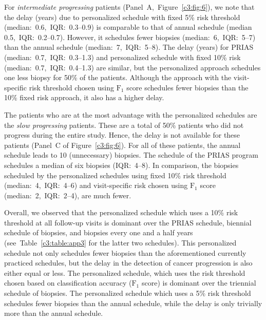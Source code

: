 For \emph{intermediate progressing} patients (Panel~A,~Figure~\ref{c3:fig:6}), we note that the delay (years) due to personalized schedule with fixed 5\% risk threshold (median:~0.6,~IQR:~0.3--0.9) is comparable to that of annual schedule (median 0.5,~IQR:~0.2--0.7). However, it schedules fewer biopsies (median:~6,~IQR:~5--7) than the annual schedule (median:~7,~IQR:~5--8). The delay (years) for PRIAS (median:~0.7,~IQR:~0.3--1.3) and personalized schedule with fixed 10\% risk (median:~0.7,~IQR:~0.4--1.3) are similar, but the personalized approach schedules one less biopsy for 50\% of the patients. Although the approach with the visit-specific risk threshold chosen using $\mbox{F}_1$ score schedules fewer biopsies than the 10\% fixed risk approach, it also has a higher delay.

The patients who are at the most advantage with the personalized schedules are the \emph{slow progressing} patients. These are a total of 50\% patients who did not progress during the entire study. Hence, the delay is not available for these patients (Panel~C of Figure~\ref{c3:fig:6}). For all of these patients, the annual schedule leads to 10 (unnecessary) biopsies. The schedule of the PRIAS program schedules a median of six biopsies (IQR:~4--8). In comparison, the biopsies scheduled by the personalized schedules using fixed 10\% risk threshold (median:~4,~IQR:~4--6) and visit-specific risk chosen using $\mbox{F}_1$ score (median:~2,~IQR:~2--4), are much fewer.

Overall, we observed that the personalized schedule which uses a 10\% risk threshold at all follow-up visits is dominant over the PRIAS schedule, biennial schedule of biopsies, and biopsies every one and a half years (see~Table~\ref{c3:table:app3} for the latter two schedules). This personalized schedule not only schedules fewer biopsies than the aforementioned currently practiced schedules, but the delay in the detection of cancer progression is also either equal or less. The personalized schedule, which uses the risk threshold chosen based on classification accuracy ($\mbox{F}_1$ score) is dominant over the triennial schedule of biopsies. The personalized schedule which uses a 5\% risk threshold schedules fewer biopsies than the annual schedule, while the delay is only trivially more than the annual schedule.